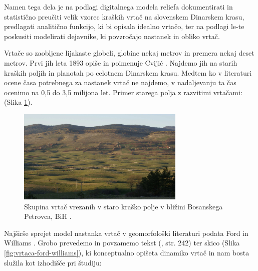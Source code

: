 \documentclass[a4paper, twoside, 12pt]{book}
\begin{document}
Namen tega dela je na podlagi digitalnega modela reliefa dokumentirati in statistično preučiti velik vzorec kraških vrtač na slovenskem Dinarskem krasu, predlagati analitično funkcijo, ki bi opisala idealno vrtačo, ter na podlagi le-te poskusiti modelirati dejavnike, ki povzročajo nastanek in obliko vrtač.

Vrtače so zaobljene lijakaste globeli, globine nekaj metrov in premera nekaj deset metrov. Prvi jih leta 1893 opiše in poimenuje Cvijić \cite{cvijic1893}. Najdemo jih na starih kraških poljih in planotah po celotnem Dinarskem krasu. Medtem ko v literaturi ocene časa potrebnega za nastanek vrtač ne najdemo, v nadaljevanju ta čas ocenimo na 0,5 do 3,5 milijona let. Primer starega polja z razvitimi vrtačami: (Slika \ref{fig:vrtace-bpetrovac}). 

  \begin{figure}[h]
    \begin{center}
      \includegraphics[width=8cm]{slike/bpetrovac}
    \end{center}
    \caption{Skupina vrtač vrezanih v staro kraško polje v bližini Bosanskega Petrovca, BiH \cite{bpetrovac}.}
    \label{fig:vrtace-bpetrovac}
  \end{figure}

Najširše sprejet model nastanka vrtač v geomorfološki literaturi podata Ford in Williams \cite{ford2007karst}. Grobo prevedemo in povzamemo tekst (\cite{ford2007karst}, str. 242) ter skico (Slika \ref{fig:vrtaca-ford-williams}), ki konceptualno opišeta dinamiko vrtač in nam bosta služila kot izhodišče pri študiju:
\end{document}
